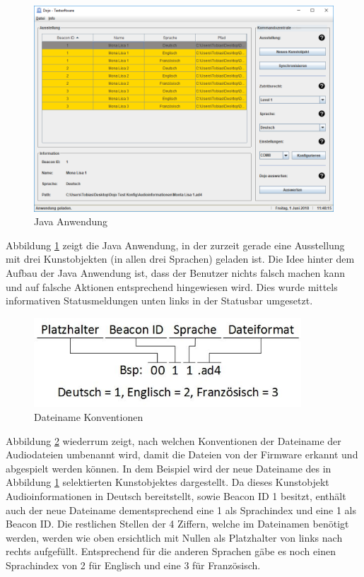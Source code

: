\begin{figure}[htb]
	\centering
	\includegraphics[width=\textwidth]{graphics/Java_Anwendung.png}
	\caption{Java Anwendung}
	\label{fig:Java Anwendung}
\end{figure}

Abbildung \ref{fig:Java Anwendung} zeigt die Java Anwendung, in der zurzeit gerade eine Ausstellung mit drei Kunstobjekten (in allen drei Sprachen) geladen ist. Die Idee hinter dem Aufbau der Java Anwendung ist, dass der Benutzer nichts falsch machen kann und auf falsche Aktionen entsprechend hingewiesen wird. Dies wurde mittels informativen Statusmeldungen unten links in der Statusbar umgesetzt.

\begin{figure}[htb]
	\centering
	\includegraphics[width=10cm]{graphics/Dateiname_Konvention.jpeg}
	\caption{Dateiname Konventionen}
	\label{fig:Dateiname Konventionen}
\end{figure}

Abbildung \ref{fig:Dateiname Konventionen} wiederrum zeigt, nach welchen Konventionen der Dateiname der Audiodateien umbenannt wird, damit die Dateien von der Firmware erkannt und abgespielt werden können. In dem Beispiel wird der neue Dateiname des in Abbildung \ref{fig:Java Anwendung} selektierten Kunstobjektes dargestellt. Da dieses Kunstobjekt Audioinformationen in Deutsch bereitstellt, sowie Beacon ID 1 besitzt, enthält auch der neue Dateiname dementsprechend eine 1 als Sprachindex und eine 1 als Beacon ID. Die restlichen Stellen der 4 Ziffern, welche im Dateinamen benötigt werden, werden wie oben ersichtlich mit Nullen als Platzhalter von links nach rechts aufgefüllt. Entsprechend für die anderen Sprachen gäbe es noch einen Sprachindex von 2 für Englisch und eine 3 für Französisch.

